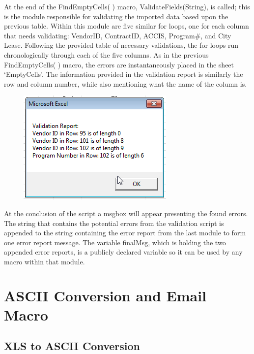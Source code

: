 \documentclass[12pt,a4paper]{report}
\begin{document}
        At the end of the FindEmptyCells( ) macro, ValidateFields(String), is called; this is the module responsible for validating the imported data based upon the previous table.
        \newline
        \newline
        Within this module are five similar for loops, one for each column that needs validating: VendorID, ContractID, ACCIS, Program#, and City Lease. Following the provided table of necessary validations, the for loops run chronologically through each of the five columns. 
        \newline
        \newline
        As in the previous FindEmptyCells( ) macro, the errors are instantaneously placed in the sheet `EmptyCells'. The information provided in the validation report is similarly the row and column number, while also mentioning what the name of the column is. 
        \newline
        \begin{figure}[h]
        \centering
        \includegraphics{MasterValidationMsgbox}
        \end{figure}
        \newline
        At the conclusion of the script a msgbox will appear presenting the found errors. The string that contains the potential errors from the validation script is appended to the string containing the error report from the last module to form one error report message. The variable finalMsg, which is holding the two appended error reports, is a publicly declared variable so it can be used by any macro within that module.


\chapter{ASCII Conversion and Email Macro}
   \section{XLS to ASCII Conversion}
\end{document}
